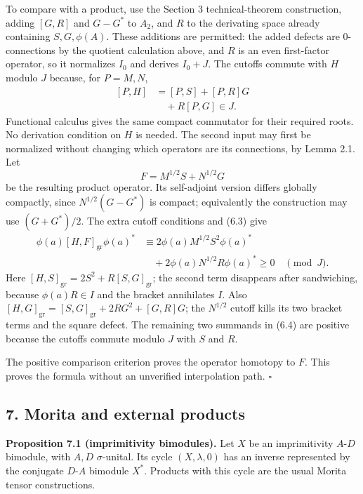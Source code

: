 \documentclass[
  11pt,
]{article}
\begin{document}
To compare with a product, use the Section 3 technical-theorem
construction, adding \([G,R]\) and \(G-G^*\) to \(A_2\), and \(R\) to
the derivating space already containing \(S,G,\phi(A)\). These additions
are permitted: the added defects are \(0\)-connections by the quotient
calculation above, and \(R\) is an even first-factor operator, so it
normalizes \(I_0\) and derives \(I_0+J\). The cutoffs commute with \(H\)
modulo \(J\) because, for \(P=M,N\), \[
\begin{aligned}
\left[P,H\right]&=[P,S]+[P,R]G\\
&\quad+R[P,G]\in J.
\end{aligned}
\] Functional calculus gives the same compact commutator for their
required roots. No derivation condition on \(H\) is needed. The second
input may first be normalized without changing which operators are its
connections, by Lemma 2.1. Let \[
F=M^{1/2}S+N^{1/2}G
\] be the resulting product operator. Its self-adjoint version differs
globally compactly, since \(N^{1/2}(G-G^*)\) is compact; equivalently
the construction may use \((G+G^*)/2\). The extra cutoff conditions and
(6.3) give \[
\begin{aligned}
\phi(a)[H,F]_{\mathrm{gr}}\phi(a)^*
&\equiv2\phi(a)M^{1/2}S^2\phi(a)^*\\
&\quad+2\phi(a)N^{1/2}R\phi(a)^*\geq0
\quad\pmod J.
\end{aligned}
\tag{6.4}
\] Here \([H,S]_{\mathrm{gr}}=2S^2+R[S,G]_{\mathrm{gr}}\); the second
term disappears after sandwiching, because \(\phi(a)R\in I\) and the
bracket annihilates \(I\). Also
\([H,G]_{\mathrm{gr}}=[S,G]_{\mathrm{gr}}+2RG^2+[G,R]G\); the
\(N^{1/2}\) cutoff kills its two bracket terms and the square defect.
The remaining two summands in (6.4) are positive because the cutoffs
commute modulo \(J\) with \(S\) and \(R\).

The positive comparison criterion proves the operator homotopy to \(F\).
This proves the formula without an unverified interpolation path.
\(\square\)

\subsection{7. Morita and external
products}\label{morita-and-external-products}

\textbf{Proposition 7.1 (imprimitivity bimodules).} Let \(X\) be an
imprimitivity \(A\)-\(D\) bimodule, with \(A,D\) \(\sigma\)-unital. Its
cycle \((X,\lambda,0)\) has an inverse represented by the conjugate
\(D\)-\(A\) bimodule \(X^*\). Products with this cycle are the usual
Morita tensor constructions.
\end{document}
